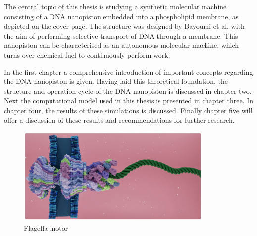 The central topic of this thesis is studying a synthetic molecular machine consisting of
a DNA nanopiston embedded into a phospholipid membrane, as depicted on the cover page.
The structure was designed by Bayoumi et al. with the aim of performing
selective transport of DNA through a membrane.\cite{Bayoumi21} This
nanopiston can be characterised as an autonomous molecular machine, which turns over
chemical fuel to continuously perform work.


In the first chapter a comprehensive introduction of important concepts
regarding the DNA nanopiston is given. Having laid this theoretical foundation, the
structure and operation cycle of the DNA nanopiston is discussed in chapter two. Next the
computational model used in this thesis is presented in chapter three. In chapter four,
the results of these simulations is discussed. Finally chapter five will offer a
discussion of these results and recommendations for further research.
\vspace{0.5cm}
\begin{figure}[ht]
\begin{center}
  \includegraphics[width=0.85\textwidth]{Figures/flagella2.png}
  \caption[short lof/lot caption]{Flagella motor \cite{Tan2021, blender, ChimeraX}}
\end{center}
\end{figure}

